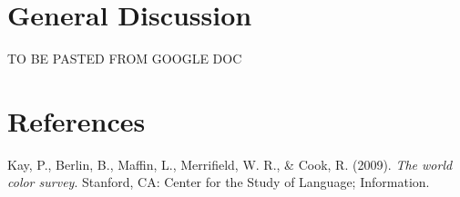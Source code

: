 \documentclass[floatsintext,man]{apa6}
\theoremstyle{definition}
\theoremstyle{definition}
\theoremstyle{definition}
\theoremstyle{remark}
\begin{document}
\section{General Discussion}\label{general-discussion}

TO BE PASTED FROM GOOGLE DOC

\newpage

\section{References}\label{references}

\begingroup
\setlength{\parindent}{-0.5in} \setlength{\leftskip}{0.5in}

\hypertarget{refs}{}
\hypertarget{ref-berlin2009}{}
Kay, P., Berlin, B., Maffin, L., Merrifield, W. R., \& Cook, R. (2009).
\emph{The world color survey}. Stanford, CA: Center for the Study of
Language; Information.

\endgroup
\end{document}
